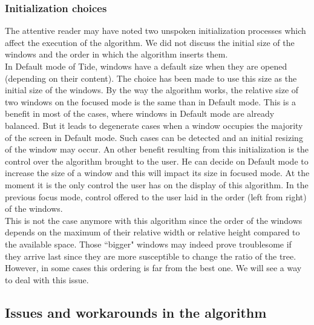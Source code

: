 \documentclass{acmtog}
\begin{document}
\subsubsection{Initialization choices}

The attentive reader may have noted two unspoken initialization processes which affect the execution of the algorithm. We did not discuss the initial size of the windows and the order in which the algorithm inserts them. \\
In Default mode of Tide, windows have a default size when they are opened (depending on their content). The choice has been made to use this size as the initial size of the windows. By the way the algorithm works, the relative size of two windows on the focused mode is the same than in Default mode. This is a benefit in most of the cases, where windows in Default mode are already balanced. But it leads to degenerate cases when a window occupies the majority of the screen in Default mode. Such cases can be detected and an initial resizing of the window may occur. An other benefit resulting from this initialization is the control over the algorithm brought to the user. He can decide on Default mode to increase the size of a window and this will impact its size in focused mode. At the moment it is the only control the user has on the display of this algorithm. In the previous focus mode, control offered to the user laid in the order (left from right) of the windows. \\
This is not the case anymore with this algorithm since the order of the windows depends on the maximum of their relative width or relative height compared to the available space. Those ``bigger" windows may indeed prove troublesome if they arrive last since they are more susceptible to change the ratio of the tree. However, in some cases this ordering is far from the best one. We will see a way to deal with this issue.

\subsection{Issues and workarounds in the algorithm}
\end{document}
